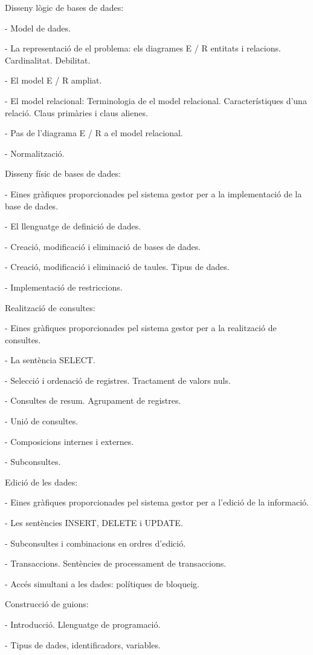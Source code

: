 \documentclass[catalan, a4paper, 12pt, titlepage]{article}
\begin{document}
Disseny lògic de bases de dades:

- Model de dades.

- La representació de el problema: els diagrames E / R entitats i relacions. Cardinalitat. Debilitat.

- El model E / R ampliat.

- El model relacional: Terminologia de el model relacional. Característiques d'una relació. Claus primàries i claus alienes.

- Pas de l'diagrama E / R a el model relacional.

- Normalització.

Disseny físic de bases de dades:

- Eines gràfiques proporcionades pel sistema gestor per a la implementació de la base de dades.

- El llenguatge de definició de dades.

- Creació, modificació i eliminació de bases de dades.

- Creació, modificació i eliminació de taules. Tipus de dades.

- Implementació de restriccions.

Realització de consultes:

- Eines gràfiques proporcionades pel sistema gestor per a la realització de consultes.

- La sentència SELECT.

- Selecció i ordenació de registres. Tractament de valors nuls.

- Consultes de resum. Agrupament de registres.

- Unió de consultes.

- Composicions internes i externes.

- Subconsultes.

Edició de les dades:

- Eines gràfiques proporcionades pel sistema gestor per a l'edició de la informació.

- Les sentències INSERT, DELETE i UPDATE.

- Subconsultes i combinacions en ordres d'edició.

- Transaccions. Sentències de processament de transaccions.

- Accés simultani a les dades: polítiques de bloqueig.

Construcció de guions:

- Introducció. Llenguatge de programació.

- Tipus de dades, identificadors, variables.
\end{document}
